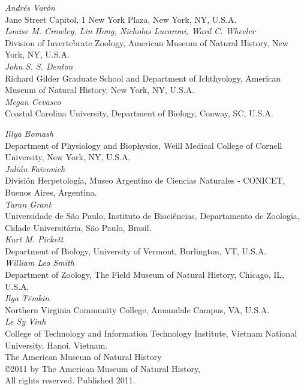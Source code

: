 \documentclass[11pt]{book}
\begin{document}
\begin{flushleft}
    \small
{\it
Andr\'es Var\'on}\\
Jane Street Capitol, 1 New York Plaza, New York, NY, U.S.A. \\
\smallskip 
{\it
Louise M. Crowley, Lin Hong, Nicholas Lucaroni, Ward C. Wheeler \\
}
Division of Invertebrate Zoology, American Museum of Natural History, New York, NY, U.S.A.\\
\smallskip
{\it
John S. S. Denton\\
}
Richard Gilder Graduate School and Department of Ichthyology, American Museum of Natural History, New York, NY, U.S.A.\\
\smallskip
{\it
Megan Cevasco} \\
Coastal Carolina University, Department of Biology, Conway, SC, U.S.A. \\
\vspace*{0.75cm}

{\it
Illya Bomash}\\
Department of Physiology and Biophysics, Weill Medical College of Cornell University, New York, NY, U.S.A.\\
\smallskip
{\it
Juli\'an Faivovich}\\
Divisi\'on Herpetolog\'ia, Museo Argentino de Ciencias Naturales - CONICET, Buenos Aires, Argentina.\\
\smallskip
{\it
Taran Grant}\\
Universidade de S\~{a}o Paulo, Instituto de Bioci\^{e}ncias, Departamento de Zoologia, Cidade Universit\'aria, 
S\~{a}o Paulo, Brasil.\\
\smallskip
{\it
Kurt M. Pickett}\\
Department of Biology, University of Vermont, Burlington, VT, U.S.A. \\
\smallskip
{\it
William Leo Smith}\\
Department of Zoology, The Field Museum of Natural History, Chicago, IL, U.S.A.\\
\smallskip
{\it
Ilya T\"emkin} \\
Northern Virginia Community College, Annandale Campus, VA, U.S.A. \\
\smallskip
{\it
Le Sy Vinh}\\
College of Technology and Information Technology Institute, Vietnam National University, Hanoi, Vietnam.  \\

\vspace*{0.25cm}
The American Museum of Natural History\\
\copyright  2011 by The American Museum of Natural History, \\
All rights reserved. Published 2011.


\end{flushleft}
\end{document}
